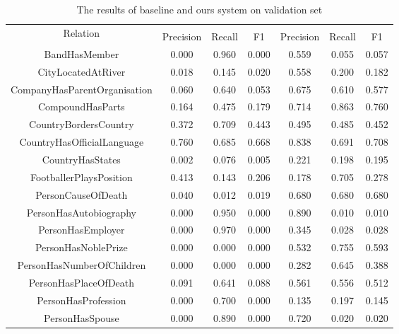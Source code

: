 \documentclass[]{ceurart}
\begin{document}
\begin{table}[h!]
    \centering
    \caption{The results of baseline and ours system on validation set }  \label{tab-detail}
    \begin{tabular}{|c|c|c|c|c|c|c|}
        \hline
        \multirow{2}{*}{Relation} & \multicolumn{3}{|c|}{} & \multicolumn{3}{|c|}{} \\\cline{2-7}
         & Precision & Recall & F1 & Precision & Recall & F1 \\\hline
BandHasMember                &  0.000& 0.960 & 0.000  &      0.559  &  0.055  &  0.057    \\  
CityLocatedAtRiver           &  0.018& 0.145 & 0.020  &      0.558  &  0.200  &  0.182    \\  
CompanyHasParentOrganisation &  0.060& 0.640 & 0.053  &      0.675  &  0.610  &  0.577    \\  
CompoundHasParts             &  0.164& 0.475 & 0.179  &      0.714  &  0.863  &  0.760    \\  
CountryBordersCountry        &  0.372& 0.709 & 0.443  &      0.495  &  0.485  &  0.452    \\  
CountryHasOfficialLanguage   &  0.760& 0.685 & 0.668  &      0.838  &  0.691  &  0.708    \\  
CountryHasStates             &  0.002& 0.076 & 0.005  &      0.221  &  0.198  &  0.195    \\  
FootballerPlaysPosition      &  0.413& 0.143 & 0.206  &      0.178  &  0.705  &  0.278    \\  
PersonCauseOfDeath           &  0.040& 0.012 & 0.019  &      0.680  &  0.680  &  0.680    \\  
PersonHasAutobiography       &  0.000& 0.950 & 0.000  &      0.890  &  0.010  &  0.010    \\  
PersonHasEmployer            &  0.000& 0.970 & 0.000  &      0.345  &  0.028  &  0.028    \\ 
PersonHasNoblePrize          &  0.000& 0.000 & 0.000  &      0.532  &  0.755  &  0.593    \\  
PersonHasNumberOfChildren    &  0.000& 0.000 & 0.000  &      0.282  &  0.645  &  0.388    \\  
PersonHasPlaceOfDeath        &  0.091& 0.641 & 0.088  &      0.561  &  0.556  &  0.512    \\ 
PersonHasProfession          &  0.000& 0.700 & 0.000  &      0.135  &  0.197  &  0.145    \\  
PersonHasSpouse              &  0.000& 0.890 & 0.000  &      0.720  &  0.020  &  0.020    \\  

\end{tabular}
\end{table}
\end{document}
